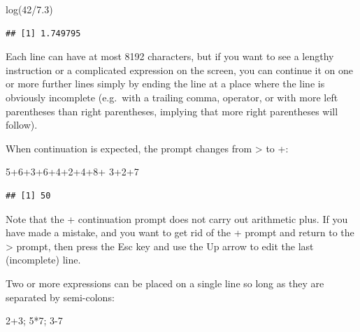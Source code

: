 \documentclass[
]{book}
\newenvironment{Shaded}{\begin{snugshade}}{\end{snugshade}}
\newcommand{\DecValTok}[1]{\textcolor[rgb]{0.00,0.00,0.81}{#1}}
\newcommand{\FloatTok}[1]{\textcolor[rgb]{0.00,0.00,0.81}{#1}}
\newcommand{\FunctionTok}[1]{\textcolor[rgb]{0.00,0.00,0.00}{#1}}
\newcommand{\NormalTok}[1]{#1}
\newcommand{\SpecialCharTok}[1]{\textcolor[rgb]{0.00,0.00,0.00}{#1}}
\begin{document}
\begin{Shaded}
\begin{Highlighting}[]
\FunctionTok{log}\NormalTok{(}\DecValTok{42}\SpecialCharTok{/}\FloatTok{7.3}\NormalTok{)}
\end{Highlighting}
\end{Shaded}

\begin{verbatim}
## [1] 1.749795
\end{verbatim}

Each line can have at most 8192 characters, but if you want to see a lengthy instruction or a complicated expression on the screen, you can continue it on one or more further lines simply by ending the line at a place where the line is obviously incomplete (e.g.~with a trailing comma, operator, or with more left parentheses than right parentheses, implying that more right parentheses will follow).

When continuation is expected, the prompt changes from \textgreater{} to +:

\begin{Shaded}
\begin{Highlighting}[]
\DecValTok{5}\SpecialCharTok{+}\DecValTok{6}\SpecialCharTok{+}\DecValTok{3}\SpecialCharTok{+}\DecValTok{6}\SpecialCharTok{+}\DecValTok{4}\SpecialCharTok{+}\DecValTok{2}\SpecialCharTok{+}\DecValTok{4}\SpecialCharTok{+}\DecValTok{8}\SpecialCharTok{+}
\DecValTok{3}\SpecialCharTok{+}\DecValTok{2}\SpecialCharTok{+}\DecValTok{7}
\end{Highlighting}
\end{Shaded}

\begin{verbatim}
## [1] 50
\end{verbatim}

Note that the + continuation prompt does not carry out arithmetic plus. If you have made a mistake, and you want to get rid of the + prompt and return to the \textgreater{} prompt, then press the Esc key and use the Up arrow to edit the last (incomplete) line.

Two or more expressions can be placed on a single line so long as they are separated by semi-colons:

\begin{Shaded}
\begin{Highlighting}[]
\DecValTok{2}\SpecialCharTok{+}\DecValTok{3}\NormalTok{; }\DecValTok{5}\SpecialCharTok{*}\DecValTok{7}\NormalTok{; }\DecValTok{3{-}7}
\end{Highlighting}
\end{Shaded}
\end{document}

